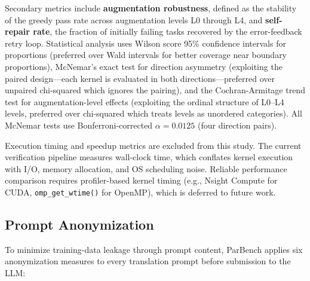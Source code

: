 \documentclass[conference]{IEEEtran}
\begin{document}
Secondary metrics include \textbf{augmentation robustness}, defined as the stability of the greedy pass rate across augmentation levels L0 through L4, and \textbf{self-repair rate}, the fraction of initially failing tasks recovered by the error-feedback retry loop.
Statistical analysis uses Wilson score 95\% confidence intervals for proportions (preferred over Wald intervals for better coverage near boundary proportions), McNemar's exact test for direction asymmetry (exploiting the paired design---each kernel is evaluated in both directions---preferred over unpaired chi-squared which ignores the pairing), and the Cochran-Armitage trend test for augmentation-level effects (exploiting the ordinal structure of L0--L4 levels, preferred over chi-squared which treats levels as unordered categories). All McNemar tests use Bonferroni-corrected $\alpha = 0.0125$ (four direction pairs).

Execution timing and speedup metrics are excluded from this study. The current verification pipeline measures wall-clock time, which conflates kernel execution with I/O, memory allocation, and OS scheduling noise. Reliable performance comparison requires profiler-based kernel timing (e.g., Nsight Compute for CUDA, \texttt{omp\_get\_wtime()} for OpenMP), which is deferred to future work.

\subsection{Prompt Anonymization}
\label{sec:anonymization}

To minimize training-data leakage through prompt content, ParBench applies six anonymization measures to every translation prompt before submission to the LLM:
\end{document}
